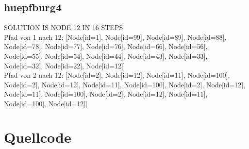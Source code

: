 \subsection{huepfburg4}\label{subsec:huepfburg4}
SOLUTION IS NODE 12 IN 16 STEPS \\
Pfad von 1 nach 12: [Node[id=1], Node[id=99], Node[id=89], Node[id=88], Node[id=78], Node[id=77], Node[id=76], Node[id=66], Node[id=56], Node[id=55], Node[id=54], Node[id=44], Node[id=43], Node[id=33], Node[id=32], Node[id=22], Node[id=12]] \\
Pfad von 2 nach 12: [Node[id=2], Node[id=12], Node[id=11], Node[id=100], Node[id=2], Node[id=12], Node[id=11], Node[id=100], Node[id=2], Node[id=12], Node[id=11], Node[id=100], Node[id=2], Node[id=12], Node[id=11], Node[id=100], Node[id=12]]


\section{Quellcode}\label{sec:quellcode}

